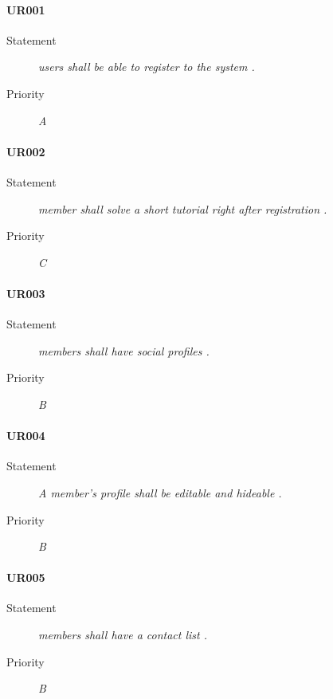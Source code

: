 \paragraph{UR001}
  \begin{description}
  \item [Statement] 
    \textit{ \gls{user}s shall be able to register to the system
    .}
  \item [Priority] \textit{A}
\end{description}
    
\paragraph{UR002}
  \begin{description}
  \item [Statement] 
    \textit{ \gls{member} shall solve a short tutorial right after registration
    .}
  \item [Priority] \textit{C}
\end{description}

\paragraph{UR003}
  \begin{description}
  \item [Statement] 
    \textit{ \gls{member}s shall have social profiles
    .}
  \item [Priority] \textit{B}
\end{description}

\paragraph{UR004}
  \begin{description}
  \item [Statement] 
    \textit{ A \gls{member}'s profile shall be editable and hideable
    .}
  \item [Priority] \textit{B}
\end{description}

\paragraph{UR005}
  \begin{description}
  \item [Statement] 
    \textit{ \gls{member}s shall have a contact list
    .}
  \item [Priority] \textit{B}
\end{description}

